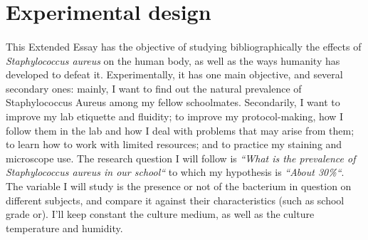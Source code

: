 \section{Experimental design}
\paragraph{}This Extended Essay has the objective of studying bibliographically the effects of \emph{Staphylococcus aureus} on the human body, as well as the ways humanity has developed to defeat it. Experimentally, it has one main objective, and several secondary ones: mainly, I want to find out the natural prevalence of Staphylococcus Aureus among my fellow schoolmates. Secondarily, I want to improve my lab etiquette and fluidity; to improve my protocol-making, how I follow them in the lab and how I deal with problems that may arise from them; to learn how to work with limited resources; and to practice my staining and microscope use. The research question I will follow is \emph{``What is the prevalence of \emph{Staphylococcus aureus} in our school``} to which my hypothesis is \emph{``About 30\%``}. The variable I will study is the presence or not of the bacterium in question on different subjects, and compare it against their characteristics (such as school grade or). I'll keep constant the culture medium, as well as the culture temperature and humidity. 
